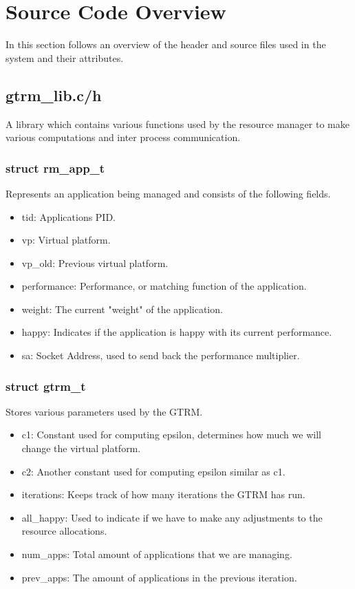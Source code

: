 \documentclass[nobiblatex]{LTHthesis}
\begin{document}
\chapter{Source Code Overview}
In this section follows an overview of the header and source files used in the system and their attributes.

\section{gtrm\_lib.c/h}
A library which contains various functions used by the resource manager to make various computations and inter process communication.

\subsection{struct rm\_app\_t}
Represents an application being managed and consists of the following fields.
\begin{itemize}
\item tid: Applications PID.
\item vp: Virtual platform.
\item vp\_old: Previous virtual platform.
\item performance: Performance, or matching function of the application.
\item weight: The current "weight" of the application.
\item happy: Indicates if the application is happy with its current performance.
\item sa: Socket Address, used to send back the performance multiplier.
\end{itemize}

\subsection{struct gtrm\_t}
Stores various parameters used by the GTRM.
\begin{itemize}
\item c1: Constant used for computing epsilon, determines how much we will change the virtual platform.
\item c2: Another constant used for computing epsilon similar as c1.
\item iterations: Keeps track of how many iterations the GTRM has run.
\item all\_happy: Used to indicate if we have to make any adjustments to the resource allocations.
\item num\_apps: Total amount of applications that we are managing.
\item prev\_apps: The amount of applications in the previous iteration.
\end{itemize}
\end{document}
